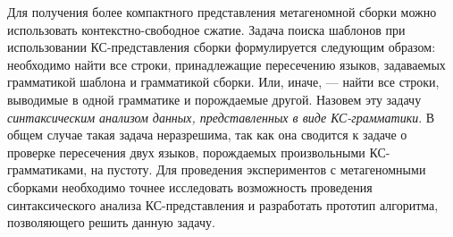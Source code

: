 Для получения более компактного представления метагеномной сборки можно использовать контекстно-свободное сжатие.
Задача поиска шаблонов при использовании  КС-представления сборки формулируется следующим образом: необходимо найти все строки, принадлежащие пересечению языков, задаваемых грамматикой шаблона и грамматикой сборки. 
Или, иначе, --- найти все строки, выводимые в одной грамматике и порождаемые другой. Назовем эту задачу \textit{синтаксическим анализом данных, представленных в виде КС-грамматики}.
В общем случае такая задача неразрешима, так как она сводится к задаче о проверке пересечения двух языков, порождаемых произвольными КС-грамматиками, на пустоту. Для проведения экспериментов с метагеномными сборками необходимо точнее исследовать возможность проведения синтаксического анализа КС-представления и разработать прототип алгоритма, позволяющего решить данную задачу.